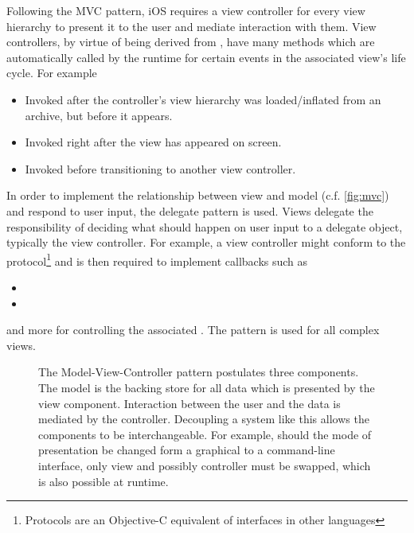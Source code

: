 Following the MVC pattern, iOS requires a view controller for every view hierarchy
to present it to the user and mediate interaction with them. View controllers, by
virtue of being derived from , have many methods which are
automatically called by the runtime for certain events in the associated view's
life cycle. For example

\begin{itemize}[align=left]
   \item[\code{viewDidLoad}] Invoked after the controller's view hierarchy was
      loaded/inflated from an archive, but before it appears.
   \item[\code{viewDidAppear}] Invoked right after the view has appeared on
      screen.
   \item[\code{prepareForSegue}] Invoked before transitioning to another view
      controller.
\end{itemize}

In order to implement the relationship between view and model (c.f.
\autoref{fig:mvc}) and respond to user input, the delegate pattern \citep[ch.
1.6]{gamma1995} is used. Views delegate the responsibility of deciding what
should happen on user input to a delegate object, typically the view controller.
For example, a view controller might conform to the 
protocol\footnote{Protocols are an Objective-C equivalent of interfaces in other
languages} and is then required to implement callbacks such as
\begin{itemize}
   \item {}
   \item {}
\end{itemize}
and more for controlling the associated . The pattern is used
for all complex views.

\begin{figure}[h]
   {\centering      
      
      \caption[The Model-View-Controller pattern]{The Model-View-Controller pattern postulates three components.
         The model is the backing store for all data which is presented by the view
         component. Interaction between the user and the data is mediated by the
         controller. Decoupling a system like this allows the components to be
         interchangeable. For example, should the mode of presentation be changed form a
         graphical to a command-line interface, only view and possibly controller must be
      swapped, which is also possible at runtime.}
   \label{fig:mvc}}
\end{figure}

